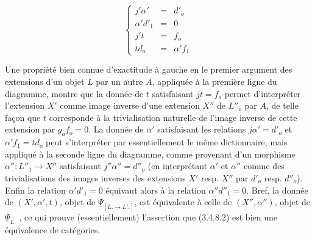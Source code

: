 \begin{center}
\end{center}
\begin{equation*}
\left\{ \begin{array}{rcl} j'\alpha' & = & d'_o \\ \alpha'd'_1 & = & 0 \\ j't & = & f_o \\ td_o & = & \alpha'f_1 \end{array} \right.
\end{equation*}

Une propriété bien connue d'exactitude à gauche en le premier argument des extensions d'un objet $L$ par un autre $A$, appliquée à la première ligne du diagramme, montre que la donnée de $t$ satisfaisant $jt = f_o$ permet d'interpréter l'extension $X'$ comme image inverse d'une extension $X''$ de $L''_o$ par $A$, de telle façon que $t$ corresponde à la trivialisation naturelle de l'image inverse de cette extension par $g_o f_o = 0$. La donnée de $\alpha'$ satisfaisant les relations $j\alpha' = d'_o$ et $\alpha'f_1 = td_o$ peut s'interpréter par essentiellement le même dictionnaire, mais appliqué à la seconde ligne du diagramme, comme provenant d'un morphisme $\alpha'' : L''_1 \longrightarrow X''$ satisfaisant $j''\alpha'' = d''_o$ (en interprétant $\alpha'$ et $\alpha''$ comme des trivialisations des images inverses des extensions $X'$ resp. $X''$ par $d'_o$ resp. $d''_o$). Enfin la relation $\alpha'd'_1 = 0$ équivaut alors à la relation $\alpha''d''_1 = 0$. Bref, la donnée de $(X',\alpha',t)$, objet de $\underline{\Psi}_{[L. \longrightarrow L'.]}$, est équivalente à celle de $(X'',\alpha'')$, objet de $\underline{\Psi}_{L.}$ , ce qui prouve (essentiellement) l'assertion que (3.4.8.2) est bien une équivalence de catégories.

